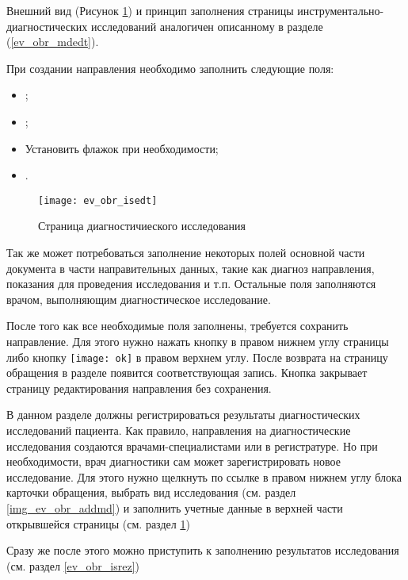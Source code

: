 {{Внешний вид (Рисунок \ref{img_ev_obr_isedt}) и принцип заполнения страницы инструментально-диагностических исследований аналогичен описанному в разделе (\ref{ev_obr_mdedt}).

При создании направления необходимо заполнить следующие поля:

\begin{itemize}
 \item {};
 \item {};
 \item Установить флажок  при необходимости;
 \item {}.
\end{itemize}

}{}

 \begin{figure}[ht]\centering
   \texttt{[image: ev\_obr\_isedt]}
   \caption{Страница диагностичиеского исследования}
   \label{img_ev_obr_isedt}
 \end{figure}  

{ 
Так же может потребоваться заполнение некоторых полей основной части документа в части направительных данных, такие как диагноз направления, показания для проведения исследования и т.п. Остальные поля заполняются врачом, выполняющим диагностическое исследование.

После того как все необходимые поля заполнены, требуется сохранить направление. Для этого нужно нажать кнопку  в правом нижнем углу страницы либо кнопку \texttt{[image: ok]} в правом верхнем углу. После возврата на страницу обращения в разделе  появится соответствующая запись. Кнопка  закрывает страницу редактирования направления без сохранения.
}
{
В данном разделе должны регистрироваться результаты диагностических исследований пациента. Как правило, направления на диагностические исследования создаются врачами-специалистами или в регистратуре. Но при необходимости, врач диагностики сам может зарегистрировать новое исследование. Для этого нужно щелкнуть по ссылке  в правом нижнем углу блока  карточки обращения, выбрать вид исследования (см. раздел \ref{img_ev_obr_addmd}) и заполнить учетные данные в верхней части открывшейся страницы (см. раздел \ref{img_ev_obr_isedt}) 

Сразу же после этого можно приступить к заполнению результатов исследования (см. раздел \ref{ev_obr_isrez})
}

}
